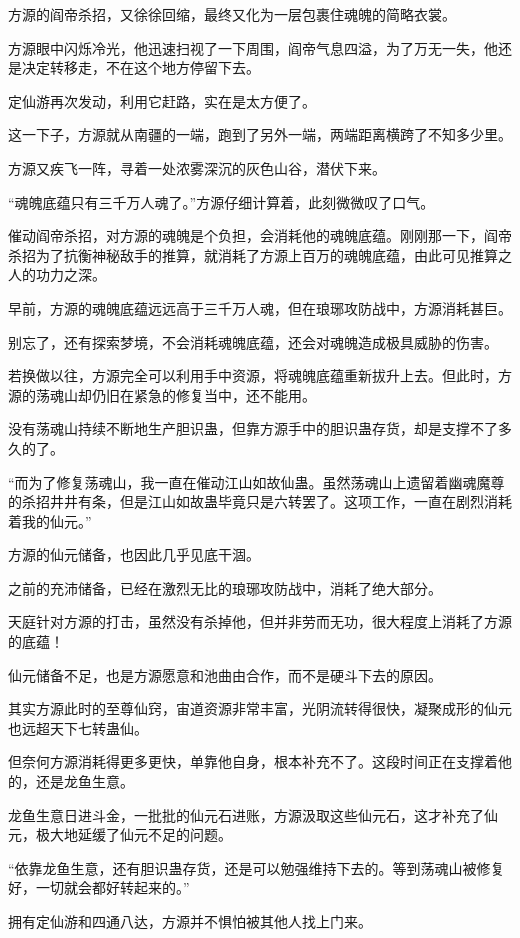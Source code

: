 \begin{this_body}
方源的阎帝杀招，又徐徐回缩，最终又化为一层包裹住魂魄的简略衣裳。

方源眼中闪烁冷光，他迅速扫视了一下周围，阎帝气息四溢，为了万无一失，他还是决定转移走，不在这个地方停留下去。

定仙游再次发动，利用它赶路，实在是太方便了。

这一下子，方源就从南疆的一端，跑到了另外一端，两端距离横跨了不知多少里。

方源又疾飞一阵，寻着一处浓雾深沉的灰色山谷，潜伏下来。

“魂魄底蕴只有三千万人魂了。”方源仔细计算着，此刻微微叹了口气。

催动阎帝杀招，对方源的魂魄是个负担，会消耗他的魂魄底蕴。刚刚那一下，阎帝杀招为了抗衡神秘敌手的推算，就消耗了方源上百万的魂魄底蕴，由此可见推算之人的功力之深。

早前，方源的魂魄底蕴远远高于三千万人魂，但在琅琊攻防战中，方源消耗甚巨。

别忘了，还有探索梦境，不会消耗魂魄底蕴，还会对魂魄造成极具威胁的伤害。

若换做以往，方源完全可以利用手中资源，将魂魄底蕴重新拔升上去。但此时，方源的荡魂山却仍旧在紧急的修复当中，还不能用。

没有荡魂山持续不断地生产胆识蛊，但靠方源手中的胆识蛊存货，却是支撑不了多久的了。

“而为了修复荡魂山，我一直在催动江山如故仙蛊。虽然荡魂山上遗留着幽魂魔尊的杀招井井有条，但是江山如故蛊毕竟只是六转罢了。这项工作，一直在剧烈消耗着我的仙元。”

方源的仙元储备，也因此几乎见底干涸。

之前的充沛储备，已经在激烈无比的琅琊攻防战中，消耗了绝大部分。

天庭针对方源的打击，虽然没有杀掉他，但并非劳而无功，很大程度上消耗了方源的底蕴！

仙元储备不足，也是方源愿意和池曲由合作，而不是硬斗下去的原因。

其实方源此时的至尊仙窍，宙道资源非常丰富，光阴流转得很快，凝聚成形的仙元也远超天下七转蛊仙。

但奈何方源消耗得更多更快，单靠他自身，根本补充不了。这段时间正在支撑着他的，还是龙鱼生意。

龙鱼生意日进斗金，一批批的仙元石进账，方源汲取这些仙元石，这才补充了仙元，极大地延缓了仙元不足的问题。

“依靠龙鱼生意，还有胆识蛊存货，还是可以勉强维持下去的。等到荡魂山被修复好，一切就会都好转起来的。”

拥有定仙游和四通八达，方源并不惧怕被其他人找上门来。


\end{this_body}
